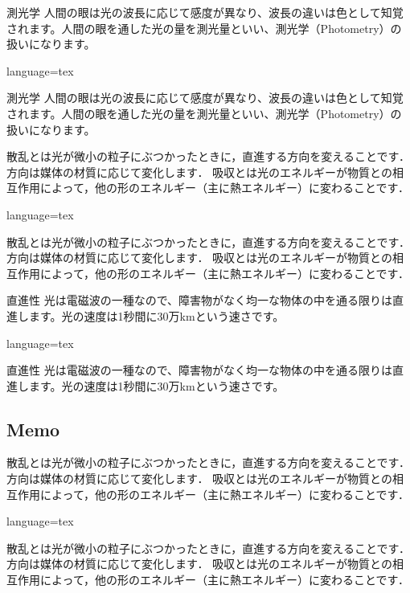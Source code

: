 \documentclass[../main]{subfiles}
\begin{document}
\begin{Admonition}[type=warn]{測光学}
    人間の眼は光の波長に応じて感度が異なり、波長の違いは色として知覚されます。人間の眼を通した光の量を測光量といい、測光学（Photometry）の扱いになります。
\end{Admonition}
\begin{Code}{language=tex}
\begin{Admonition}[type=warn]{測光学}
    人間の眼は光の波長に応じて感度が異なり、波長の違いは色として知覚されます。人間の眼を通した光の量を測光量といい、測光学（Photometry）の扱いになります。
\end{Admonition}
\end{Code}

\begin{Admonition}[type=error]{}
散乱とは光が微小の粒子にぶつかったときに，直進する方向を変えることです．方向は媒体の材質に応じて変化します．
吸収とは光のエネルギーが物質との相互作用によって，他の形のエネルギー（主に熱エネルギー）に変わることです．
\end{Admonition}
\begin{Code}{language=tex}
\begin{Admonition}[type=error]{}
    散乱とは光が微小の粒子にぶつかったときに，直進する方向を変えることです．方向は媒体の材質に応じて変化します．
    吸収とは光のエネルギーが物質との相互作用によって，他の形のエネルギー（主に熱エネルギー）に変わることです．
\end{Admonition}
\end{Code}

\begin{Admonition}[type=error]{直進性}
光は電磁波の一種なので、障害物がなく均一な物体の中を通る限りは直進します。光の速度は1秒間に30万kmという速さです。
\end{Admonition}
\begin{Code}{language=tex}
\begin{Admonition}[type=error]{直進性}
    光は電磁波の一種なので、障害物がなく均一な物体の中を通る限りは直進します。光の速度は1秒間に30万kmという速さです。
\end{Admonition}
\end{Code}

\subsection{Memo}
\begin{Memo}[width=1pt]{}
    散乱とは光が微小の粒子にぶつかったときに，直進する方向を変えることです．方向は媒体の材質に応じて変化します．
    吸収とは光のエネルギーが物質との相互作用によって，他の形のエネルギー（主に熱エネルギー）に変わることです．
\end{Memo}
\begin{Code}{language=tex}
\begin{Memo}[width=1pt]{}
    散乱とは光が微小の粒子にぶつかったときに，直進する方向を変えることです．方向は媒体の材質に応じて変化します．
    吸収とは光のエネルギーが物質との相互作用によって，他の形のエネルギー（主に熱エネルギー）に変わることです．
\end{Memo}
\end{Code}
\end{document}
